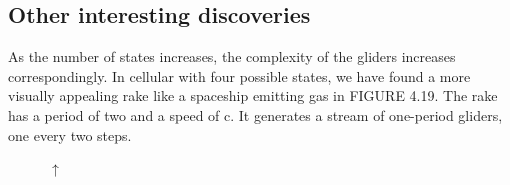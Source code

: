 \documentclass[12pt]{article}
\numberwithin{figure}{section} %
\begin{document}
\subsection{Other interesting discoveries}
As the number of states increases, the complexity of the gliders increases correspondingly. In cellular with four possible states, we have found a more visually appealing rake like a spaceship emitting gas in FIGURE 4.19. The rake has a period of two and a speed of c. It generates a stream of one-period gliders, one every two steps. 

\begin{figure}[H]
\begin{center}
{\Huge$\uparrow$}
\end{center}
\centering
	\begin{subfigure}{0.18\textwidth}
     	\centering

\end{subfigure}
\end{figure}
\end{document}
